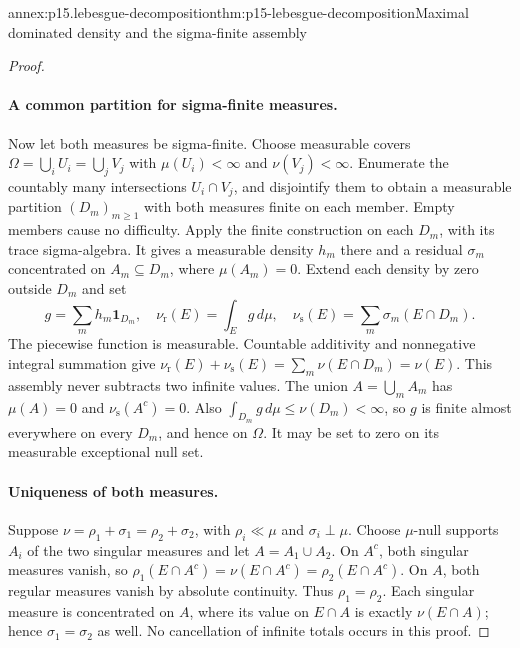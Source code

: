 \begin{annexitem}{annex:p15.lebesgue-decomposition}{thm:p15-lebesgue-decomposition}{Maximal dominated density and the sigma-finite assembly}
\begin{proof}
\paragraph{A common partition for sigma-finite measures.}
Now let both measures be sigma-finite. Choose measurable covers
\(\Omega=\bigcup_iU_i=\bigcup_jV_j\) with \(\mu(U_i)<\infty\)
and \(\nu(V_j)<\infty\). Enumerate the countably many intersections
\(U_i\cap V_j\), and disjointify them to obtain a measurable partition
\((D_m)_{m\geq1}\) with both measures finite on each member.
Empty members cause no difficulty.
Apply the finite construction on each \(D_m\), with its trace sigma-algebra.
It gives a measurable density \(h_m\) there and a residual \(\sigma_m\)
concentrated on \(A_m\subseteq D_m\), where \(\mu(A_m)=0\).
Extend each density by zero outside \(D_m\) and set
\[
 g=\sum_mh_m\mathbf1_{D_m},\quad
 \nu_{\mathrm r}(E)=\int_Eg\,d\mu,\quad
 \nu_{\mathrm s}(E)=\sum_m\sigma_m(E\cap D_m).
\]
The piecewise function is measurable. Countable additivity and
nonnegative integral summation give
\(\nu_{\mathrm r}(E)+\nu_{\mathrm s}(E)=\sum_m\nu(E\cap D_m)=\nu(E)\).
This assembly never subtracts two infinite values.
The union \(A=\bigcup_mA_m\) has \(\mu(A)=0\) and
\(\nu_{\mathrm s}(A^c)=0\).
Also \(\int_{D_m}g\,d\mu\leq\nu(D_m)<\infty\), so \(g\) is finite
almost everywhere on every \(D_m\), and hence on \(\Omega\).
It may be set to zero on its measurable exceptional null set.

\paragraph{Uniqueness of both measures.}
Suppose \(\nu=\rho_1+\sigma_1=\rho_2+\sigma_2\), with
\(\rho_i\ll\mu\) and \(\sigma_i\perp\mu\).
Choose \(\mu\)-null supports \(A_i\) of the two singular measures
and let \(A=A_1\cup A_2\).
On \(A^c\), both singular measures vanish, so
\(\rho_1(E\cap A^c)=\nu(E\cap A^c)=\rho_2(E\cap A^c)\).
On \(A\), both regular measures vanish by absolute continuity.
Thus \(\rho_1=\rho_2\).
Each singular measure is concentrated on \(A\), where its value on
\(E\cap A\) is exactly \(\nu(E\cap A)\); hence \(\sigma_1=\sigma_2\)
as well. No cancellation of infinite totals occurs in this proof.
\end{proof}
\end{annexitem}

